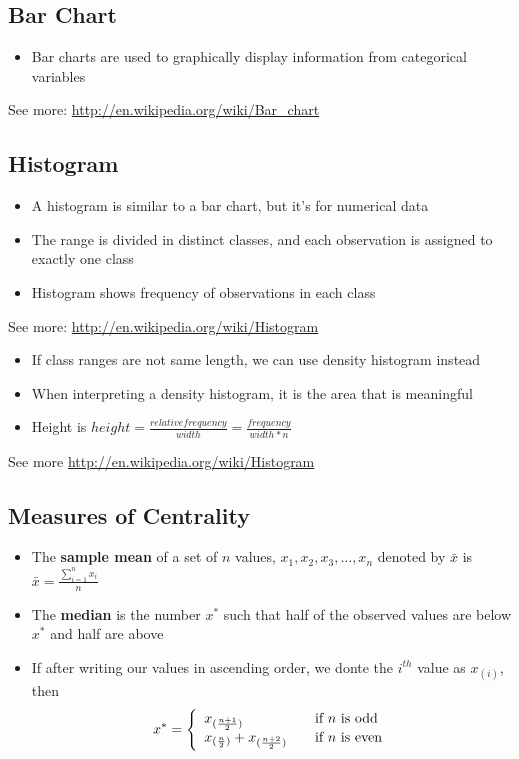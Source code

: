     \subsection{Bar Chart}
      \begin{itemize}
        \item Bar charts are used to graphically display information from
          categorical variables
      \end{itemize}
      See more: \url{http://en.wikipedia.org/wiki/Bar_chart}

    \subsection{Histogram}
      \begin{itemize}
        \item A histogram is similar to a bar chart, but it's for numerical
          data
        \item The range is divided in distinct classes, and each observation is
          assigned to exactly one class
        \item Histogram shows frequency of observations in each class
      \end{itemize}
     See more: \url{http://en.wikipedia.org/wiki/Histogram}

      \begin{itemize}
        \item If class ranges are not same length, we can use density histogram
          instead
        \item When interpreting a density histogram, it is the area that is
          meaningful
        \item Height is $ height = \frac{relative frequency}{width} =
          \frac{frequency}{width * n} $
      \end{itemize}
      See more \url{http://en.wikipedia.org/wiki/Histogram}
    \subsection{Measures of Centrality}
      \begin{itemize}
        \item The \textbf{sample mean} of a set of $n$ values, $x_1, x_2,
          x_3,\ldots, x_n$ denoted by $\bar{x}$ is $\bar{x} =
          \frac{\sum_{i=1}^{n} x_i}{n}$
        \item The \textbf{median} is the number $x^*$ such that half of the
          observed values are below $x^*$ and half are above
        \item If after writing our values in ascending order, we donte the
          $i^{th}$ value as $x_{(i)}$, then\\
          \[
              x^* = \left\{
              \begin{array}{l l}
                x_{(\frac{n+1}{2})} & \quad \text{if $n$ is odd}\\
                x_{(\frac{n}{2})}+x_{(\frac{n+2}{2})}& \quad \text{if $n$ is
              even}
              \end{array} \right.
          \]
      \end{itemize}


